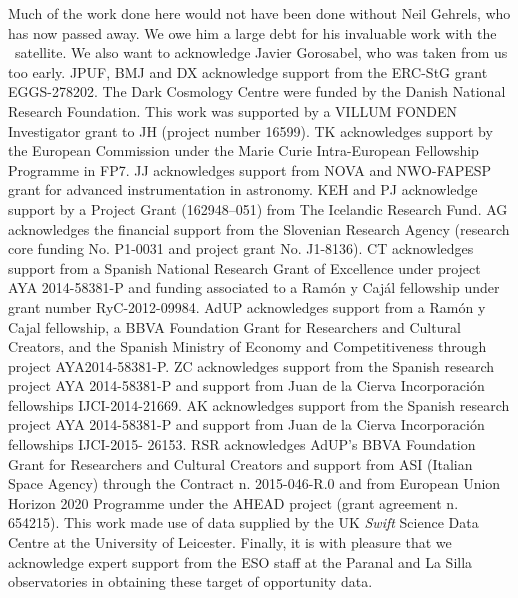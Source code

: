 \documentclass{aa}    %
\begin{document}


\begin{acknowledgements}
Much of the work done here would not have been done without Neil Gehrels, who has now passed away. We owe him a large debt for his invaluable work with the \swift~satellite. We also want to acknowledge Javier Gorosabel, who was taken from us too early. 
%
JPUF, BMJ and DX acknowledge support from the ERC-StG grant EGGS-278202.
The Dark Cosmology Centre were funded by the Danish National Research
Foundation. 
%
This work was supported by a VILLUM FONDEN Investigator grant to JH
(project number 16599). 
%
TK acknowledges support by the European Commission
under the Marie Curie Intra-European Fellowship Programme in FP7.  
%
JJ acknowledges
support from NOVA and NWO-FAPESP grant for advanced instrumentation in
astronomy. 
%
KEH and PJ acknowledge support by a Project Grant (162948--051) from
The Icelandic Research Fund. 
%
AG acknowledges the financial support from the
Slovenian Research Agency (research core funding No. P1-0031 and project grant
No. J1-8136). 
%
CT acknowledges support from a Spanish National Research Grant of Excellence
under project AYA 2014-58381-P and funding associated to a Ramón y Cajál
fellowship under grant number RyC-2012-09984.
%
AdUP acknowledges support from a Ramón y Cajal fellowship, a BBVA Foundation
Grant for Researchers and Cultural Creators, and the Spanish Ministry of Economy
and Competitiveness through project AYA2014-58381-P.
%
ZC acknowledges support from the Spanish research project AYA 2014-58381-P and
support from Juan de la Cierva Incorporaci\'on fellowships IJCI-2014-21669.
%
AK acknowledges support from the Spanish research project AYA 2014-58381-P and
support from Juan de la Cierva Incorporaci\'on fellowships IJCI-2015- 26153.
%
RSR acknowledges AdUP's BBVA Foundation Grant for Researchers and Cultural
Creators and support from ASI (Italian Space Agency) through the Contract n. 2015-046-R.0 and from European Union Horizon 2020 Programme under the AHEAD project (grant agreement n. 654215).
%
This work made use of data supplied by the UK {\it Swift} Science Data Centre at
the University of Leicester. Finally, it is with pleasure that we acknowledge
expert support from the ESO staff at the Paranal and La Silla observatories in
obtaining these target of opportunity data.


\end{acknowledgements}




\end{document}
